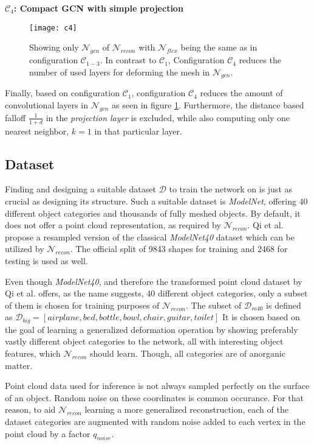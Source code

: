 \textbf{$\mathcal{C}_4$: Compact GCN with simple projection}
\begin{figure}
   \begin{center}
   \texttt{[image: c4]}
   \caption{Showing only $\mathcal{N}_{gcn}$ of $\mathcal{N}_{recon}$ with $\mathcal{N}_{flex}$ being the same
    as in configuration $\mathcal{C}_{1-3}$. In contrast to $\mathcal{C}_1$, Configuration $\mathcal{C}_4$ reduces 
    the number of used layers for deforming the mesh in $\mathcal{N}_{gcn}$.}
   \label{fig:c4}
   \end{center}
\end{figure}
Finally, based on configuration $\mathcal{C}_1$, configuration $\mathcal{C}_4$ reduces the amount of convolutional layers in $\mathcal{N}_{gcn}$ as seen in figure \ref{fig:c4}.
Furthermore, the distance based falloff $\frac{1}{1+d}$ in the \emph{projection layer} is excluded, 
while also computing only one nearest neighbor, $k=1$ in that particular layer. 

\subsection{Dataset}
\label{dataset}
   Finding and designing a suitable dataset $\mathcal{D}$
   to train the network on is just as crucial as designing its structure. 
   Such a suitable dataset is \emph{ModelNet}, offering 40 different object 
   categories and thousands of fully meshed objects. By default, it does not offer a
   point cloud representation, as required by $\mathcal{N}_{recon}$. Qi et al.
   \cite{qi2017pointnetplusplus} propose a resampled version of the classical \emph{ModelNet40}
   dataset which can be utilized by $\mathcal{N}_{recon}$.
   The official split of 9843 shapes for training and 2468 for testing is used as well. 

   Even though \emph{ModelNet40}, and therefore the transformed point cloud dataset by Qi et al. offers, as the name suggests,
   40 different object categories, only a subset of them is chosen for training purposes of $\mathcal{N}_{recon}$. 
   The subset of $\mathcal{D}_{m40}$ is defined as $\mathcal{D}_{big}=[airplane,bed,bottle,bowl,chair,guitar,toilet]$
   It is chosen based on the goal of learning a generalized deformation operation by showing preferably vastly different object categories
   to the network, all with interesting object features, which $\mathcal{N}_{recon}$ should learn. Though, all categories are of anorganic matter.

   Point cloud data used for inference is not always sampled perfectly on the surface of an object. Random noise on these coordinates is common occurance.
   For that reason, to aid $\mathcal{N}_{recon}$ learning a more generalized reconstruction, each of the dataset categories are
   augmented with random noise added to each vertex in the point cloud by a factor $q_{noise}$.

